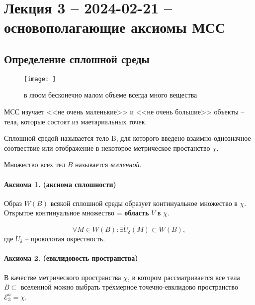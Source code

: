 \section{Лекция 3 -- 2024-02-21 -- основополагающие аксиомы МСС}

\subsection{Определение сплошной среды}

\begin{figure}[h!]
  \centering
  \texttt{[image: ]}
  \caption{в люом бесконечно малом объеме всегда много вещества}
\end{figure}



МСС изучает <<не очень маленькие>> и <<не очень большие>> объекты -- тела, которые состоят
из маетариальных точек.

\begin{definition}
  Сплошной средой называется тело B, для которого введено взаимно-однозначное соотвествие
  или отображение в некоторое метрическое простанство $\chi$.
\end{definition}


\begin{definition}
  Множество всех тел $B$ называется \emph{вселенной}.
\end{definition}

\paragraph{Аксиома 1. (аксиома сплошности)} Образ $W(B)$ всякой сплошной среды образует континуальное
множество в $\chi$. Открытое континуальное множество = \textbf{область} $V$ в $\chi$.


\[
  \forall M \in W(B) : \exists \mathring{U}_\delta (M) \subset W(B),
\]
где $\mathring{U}_\delta$ -- проколотая окрестность.

\paragraph{Аксиома 2. (евклидовость пространства)} В качестве метрического пространства $\chi$,
в котором рассматривается все тела $B \subset$ вселенной можно выбрать трёхмерное 
точечно-евклидово пространство $\mathcal{E}^a_3 = \chi$.


